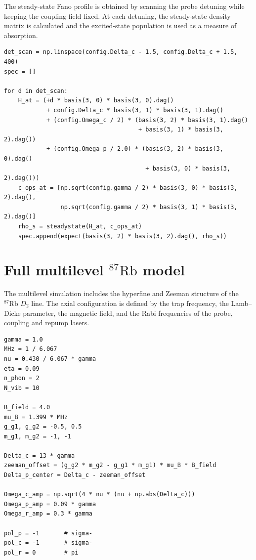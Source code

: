 \documentclass[../../thesis_main.tex]{subfiles}
\begin{document}
The steady-state Fano profile is obtained by scanning the probe
detuning while keeping the coupling field fixed. At each detuning, the
steady-state density matrix is calculated and the excited-state
population is used as a measure of absorption.

\begin{lstlisting}[caption={Calculation of the steady-state Fano profile.},
label={lst:three_level_fano}]
det_scan = np.linspace(config.Delta_c - 1.5, config.Delta_c + 1.5, 400)
spec = []

for d in det_scan:
    H_at = (+d * basis(3, 0) * basis(3, 0).dag()
            + config.Delta_c * basis(3, 1) * basis(3, 1).dag()
            + (config.Omega_c / 2) * (basis(3, 2) * basis(3, 1).dag()
                                      + basis(3, 1) * basis(3, 2).dag())
            + (config.Omega_p / 2.0) * (basis(3, 2) * basis(3, 0).dag()
                                        + basis(3, 0) * basis(3, 2).dag()))
    c_ops_at = [np.sqrt(config.gamma / 2) * basis(3, 0) * basis(3, 2).dag(),
                np.sqrt(config.gamma / 2) * basis(3, 1) * basis(3, 2).dag()]
    rho_s = steadystate(H_at, c_ops_at)
    spec.append(expect(basis(3, 2) * basis(3, 2).dag(), rho_s))
\end{lstlisting}

\section{Full multilevel $^{87}\mathrm{Rb}$ model}
\label{app:multilevel_code}

The multilevel simulation includes the hyperfine and Zeeman structure of
the $^{87}\mathrm{Rb}$ $D_2$ line. The axial configuration is defined
by the trap frequency, the Lamb--Dicke parameter, the magnetic field,
and the Rabi frequencies of the probe, coupling and repump lasers.

\begin{lstlisting}[caption={Main parameters of the multilevel axial simulation.},
label={lst:multilevel_config}]
gamma = 1.0
MHz = 1 / 6.067
nu = 0.430 / 6.067 * gamma
eta = 0.09
n_phon = 2
N_vib = 10

B_field = 4.0
mu_B = 1.399 * MHz
g_g1, g_g2 = -0.5, 0.5
m_g1, m_g2 = -1, -1

Delta_c = 13 * gamma
zeeman_offset = (g_g2 * m_g2 - g_g1 * m_g1) * mu_B * B_field
Delta_p_center = Delta_c - zeeman_offset

Omega_c_amp = np.sqrt(4 * nu * (nu + np.abs(Delta_c)))
Omega_p_amp = 0.09 * gamma
Omega_r_amp = 0.3 * gamma

pol_p = -1       # sigma-
pol_c = -1       # sigma-
pol_r = 0        # pi
\end{lstlisting}
\end{document}
